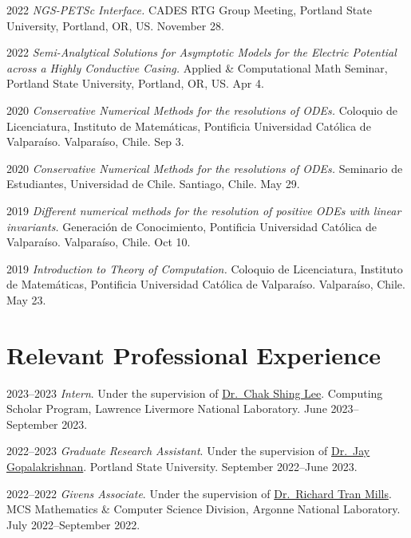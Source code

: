 \documentclass[12pt,letterpaper]{report}
\begin{document}
    \begin{tablist}

	\item[2022] \tab \emph{NGS-PETSc Interface.} CADES RTG Group Meeting, Portland State University, Portland, OR, US. November 28.

	\item[2022] \tab \emph{Semi-Analytical Solutions for Asymptotic Models for the Electric Potential across a Highly Conductive Casing.} Applied \& Computational Math Seminar, Portland State University, Portland, OR, US. Apr 4.

        \item[2020] \tab \emph{Conservative Numerical Methods for the resolutions of ODEs.} Coloquio de Licenciatura, Instituto de Matem\'aticas, Pontificia Universidad Cat\'olica de Valpara\'iso. Valpara\'iso, Chile. Sep 3.
         
        \item[2020] \tab \emph{Conservative Numerical Methods for the resolutions of ODEs.} Seminario de Estudiantes, Universidad de Chile. Santiago, Chile. May 29.

    	\item[2019] \tab \emph{Different numerical methods for the resolution of positive ODEs with linear invariants.} Generaci\'on de Conocimiento, Pontificia Universidad Cat\'olica de Valpara\'iso. Valpara\'iso, Chile. Oct 10.
    
    	\item[2019] \tab \emph{Introduction to Theory of Computation.} Coloquio de Licenciatura, Instituto de Matem\'aticas, Pontificia Universidad Cat\'olica de Valpara\'iso. Valpara\'iso, Chile. May 23.
    	
    \end{tablist}


    \section*{Relevant Professional Experience}

	\begin{tablist}

        \item[2023--2023] \emph{Intern}. Under the supervision of \href{https://people.llnl.gov/lee1029}{Dr.~Chak Shing Lee}. Computing Scholar Program, Lawrence Livermore National Laboratory. June 2023--September 2023.

        \item[2022--2023] \emph{Graduate Research Assistant}. Under the supervision of \href{https://web.pdx.edu/~gjay/}{Dr.~Jay Gopalakrishnan}. Portland State University. September 2022--June 2023.

        \item[2022--2022] \emph{Givens Associate}. Under the supervision of \href{https://climatemodeling.org/~rmills/}{Dr.~Richard Tran Mills}. MCS Mathematics \& Computer Science Division, Argonne National Laboratory. July 2022--September 2022.

	\end{tablist}
\end{document}
